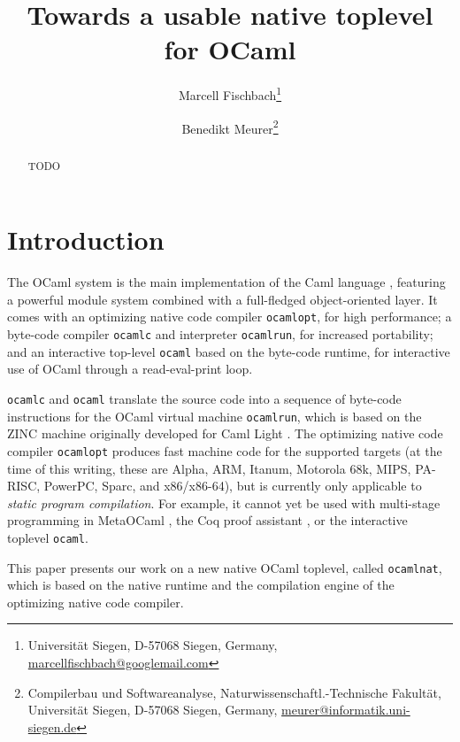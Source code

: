 \documentclass[10pt,a4paper,draft,twocolumn]{article}
\begin{document}
\title{%
  Towards a usable native toplevel for OCaml
}
\author{%
  Marcell Fischbach\thanks{
    Universit\"at Siegen,
    D-57068 Siegen,
    Germany,
    \url{marcellfischbach@googlemail.com}
  }
  \and
  Benedikt Meurer\thanks{
    Compilerbau und Softwareanalyse,
    Naturwissenschaftl.-Technische Fakult\"at,
    Universit\"at Siegen,
    D-57068 Siegen,
    Germany,
    \url{meurer@informatik.uni-siegen.de}
  }
}
\date{}

\maketitle

\begin{abstract}
  TODO
\end{abstract}


\section{Introduction}

The OCaml \cite{Leroy11,Remy02} system is the main implementation of the Caml
language \cite{Caml11}, featuring a powerful module system
combined with a full-fledged object-oriented layer. It comes with an optimizing native
code compiler \texttt{ocamlopt}, for high performance; a byte-code compiler \texttt{ocamlc}
and interpreter \texttt{ocamlrun}, for increased portability; and an interactive top-level
\texttt{ocaml} based on the byte-code runtime, for interactive use of OCaml through a
read-eval-print loop.

\texttt{ocamlc} and \texttt{ocaml} translate the source code into a sequence of byte-code
instructions for the OCaml virtual machine \texttt{ocamlrun}, which is based on the ZINC
machine \cite{Leroy90} originally developed for Caml Light \cite{Leroy02}. The optimizing
native code compiler \texttt{ocamlopt} produces fast machine code for the supported targets
(at the time of this writing, these are Alpha, ARM, Itanum, Motorola 68k, MIPS, PA-RISC, PowerPC,
Sparc, and x86/x86-64), but is currently only applicable to \emph{static program compilation}.
For example, it cannot yet be used with multi-stage programming in MetaOCaml \cite{Taha03,Taha06},
the Coq proof assistant \cite{Bertot04,Coq10}, or the interactive toplevel \texttt{ocaml}.

This paper presents our work on a new native OCaml toplevel, called \texttt{ocamlnat}, which is
based on the native runtime and the compilation engine of the optimizing native code compiler.
\end{document}
